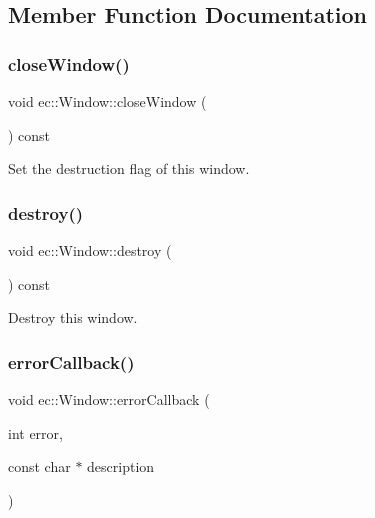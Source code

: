 \subsection{Member Function Documentation}
\mbox{\label{classec_1_1_window_aa38b17b4251dee392623910a378f60c3}} 
\subsubsection{\texorpdfstring{close\+Window()}{closeWindow()}}
{\footnotesize\ttfamily void ec\+::\+Window\+::close\+Window (\begin{DoxyParamCaption}{ }\end{DoxyParamCaption}) const}

Set the destruction flag of this window. \mbox{\label{classec_1_1_window_ae435819d1caf4349f41867b1d7338209}} 
\subsubsection{\texorpdfstring{destroy()}{destroy()}}
{\footnotesize\ttfamily void ec\+::\+Window\+::destroy (\begin{DoxyParamCaption}{ }\end{DoxyParamCaption}) const}

Destroy this window. \mbox{\label{classec_1_1_window_a1d202aaa954ea0b62cf380fb48288107}} 
\subsubsection{\texorpdfstring{error\+Callback()}{errorCallback()}}
{\footnotesize\ttfamily void ec\+::\+Window\+::error\+Callback (\begin{DoxyParamCaption}\item[{int}]{error,  }\item[{const char $\ast$}]{description }\end{DoxyParamCaption})\hspace{0.3cm}{\ttfamily [static]}}


